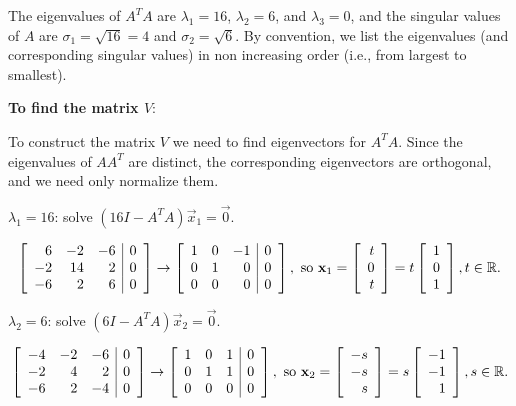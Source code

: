\documentclass{ximera}
\begin{document}
\begin{example}
\begin{explanation}
The eigenvalues of $A^TA$ are $\lambda_1=16$, $\lambda_2=6$, and
$\lambda_3=0$, and the singular values of $A$ are $\sigma_1=\sqrt{16}=4$ and
$\sigma_2=\sqrt{6}$.
By convention, we list the eigenvalues (and corresponding singular values)
in non increasing order (i.e., from largest to smallest).

\textbf{To find the matrix $V$}:

To construct the matrix $V$ we need to find eigenvectors for $A^TA$.
Since the eigenvalues of $AA^T$ are distinct, the corresponding
eigenvectors are orthogonal, and we need only normalize them.

$\lambda_1=16$: solve $(16I-A^TA)\vec{x}_1= \vec{0}$.

\[ \left[\begin{array}{rrr|r}
6 & -2 & -6 & 0 \\ -2 & 14 & 2 & 0 \\ -6 & 2 & 6 & 0
\end{array}\right]
\rightarrow
\left[\begin{array}{rrr|r}
1 & 0 & -1 & 0 \\ 0 & 1 & 0 & 0 \\ 0 & 0 & 0 & 0
\end{array}\right],
\mbox{ so }
\mathbf{x}_1 =\left[\begin{array}{r} t \\ 0 \\ t \end{array}\right]
=t\left[\begin{array}{r} 1 \\ 0 \\ 1 \end{array}\right],
t\in \mathbb{R}. \]

$\lambda_2=6$: solve $(6I-A^TA)\vec{x}_2= \vec{0}$.

\[ \left[\begin{array}{rrr|r}
-4 & -2 & -6 & 0 \\ -2 & 4 & 2 & 0 \\ -6 & 2 & -4 & 0
\end{array}\right]
\rightarrow
\left[\begin{array}{rrr|r}
1 & 0 & 1 & 0 \\ 0 & 1 & 1 & 0 \\ 0 & 0 & 0 & 0
\end{array}\right],
\mbox{ so }
\mathbf{x}_2=\left[\begin{array}{r} -s \\ -s \\ s \end{array}\right]
=s\left[\begin{array}{r} -1 \\ -1 \\ 1 \end{array}\right],
s\in \mathbb{R}. \]


\end{explanation}
\end{example}
\end{document}
